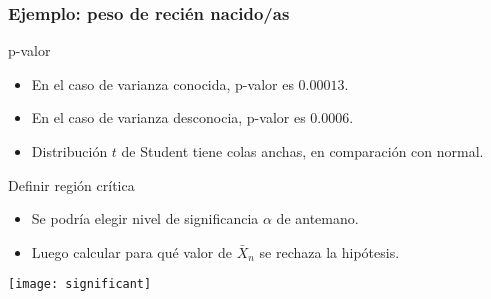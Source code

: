 \documentclass[table]{beamer}
\begin{document}
\begin{frame}
    \frametitle{Ejemplo: peso de recién nacido/as}
    \begin{block}{p-valor}
        \begin{itemize}
            \item En el caso de varianza conocida, p-valor es $0.00013$.
            \item En el caso de varianza desconocia, p-valor es $0.0006$.
            \item Distribución $t$ de Student tiene colas anchas, en comparación con normal.
        \end{itemize}
    \end{block}
    \begin{block}{Definir región crítica}
        \begin{itemize}
            \item Se podría elegir nivel de significancia $\alpha$ de antemano.
            \item Luego calcular para qué valor de $\bar{X}_{n}$ se rechaza la hipótesis.
        \end{itemize}
    \end{block}
    \begin{center}
    \end{center}
\end{frame}

\begin{frame}
    \begin{center}
        \texttt{[image: significant]}
    \end{center}
\end{frame}
\end{document}
